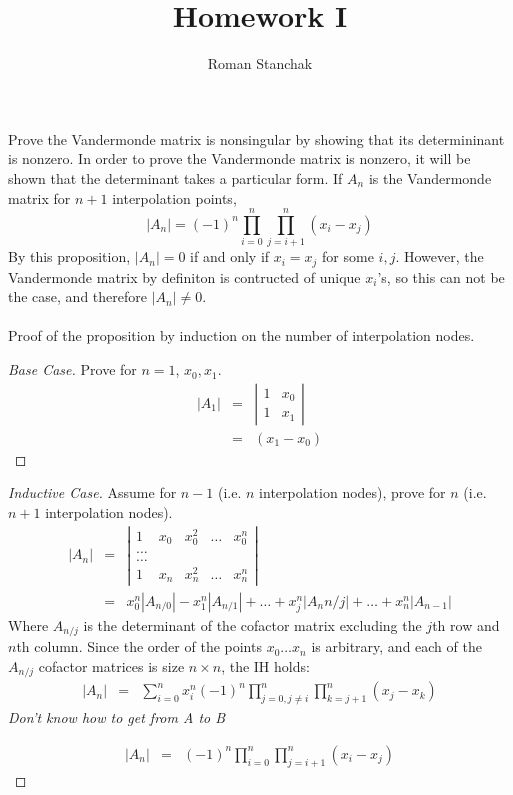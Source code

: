 \documentclass{article}
\author{Roman Stanchak}
\title{Homework I}
\newcommand{\ea}[1]{\begin{eqnarray*}#1\end{eqnarray*}}
\begin{document}
\maketitle
{} Prove the Vandermonde matrix is nonsingular by showing that its determininant is nonzero.
 In order to prove the Vandermonde matrix is nonzero, it will be shown that the determinant
takes a particular form.  If $A_n$ is the Vandermonde matrix for $n+1$ interpolation points,
\[
	|A_n| = (-1)^n\prod_{i=0}^{n}\prod_{j=i+1}^{n}(x_i-x_j)
\]
By this proposition, $|A_n|=0$ if and only if $x_i=x_j$ for some $i,j$.  However, the Vandermonde 
matrix by definiton is contructed of unique $x_i$'s, so this can not be the case, and therefore
$|A_n|\ne 0$.\\
\\
Proof of the proposition by induction on the number of interpolation nodes.
\begin{proof}[Base Case] Prove for $n=1$, $x_0,x_1$.\\
\ea{
	|A_1| &=& \left|
				  \begin{array}{cc} 1 & x_0 \\
		                            1 & x_1 
				  \end{array}
			 \right| \\
          &=& (x_1-x_0)
}
\end{proof}
\begin{proof}[Inductive Case] Assume for $n-1$ (i.e. $n$ interpolation nodes), prove for $n$ (i.e. $n+1$ interpolation nodes).\\
\ea{
	|A_n| &=& \left|
				\begin{array}{ccccc} 1 & x_0 & x_0^2 & \dots & x_0^n \\
					\dots \\
					\dots \\
					1 & x_n & x_n^2 & \dots & x_n^n
				\end{array}
			\right| \\
	&=& x_0^n|A_{n/0}| - x_1^n|A_{n/1}| + \dots + x_j^n|A_n{n/j}| + \dots + x_n^n|A_{n-1}|
}
Where $A_{n/j}$ is the determinant of the cofactor matrix excluding the $j$th 
row and $n$th column. Since the order of the points $x_0\dots x_n$ is arbitrary, 
and each of the $A_{n/j}$ cofactor matrices is size $n\times n$, the IH holds:
\ea{
	|A_n| &=& \sum_{i=0}^{n} x_i^n (-1)^n\prod_{j=0,j\ne i}^{n}\prod_{k=j+1}^{n}(x_j-x_k)
}
\textit{Don't know how to get from A to B}

\ea{
	|A_n| &=&  (-1)^n\prod_{i=0}^{n}\prod_{j=i+1}^{n} (x_i-x_j)
}
\end{proof}
\end{document}
